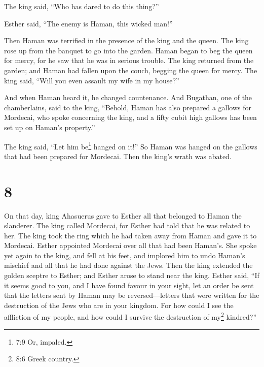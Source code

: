 The king said, ``Who has dared to do this thing?''

 Esther said, ``The enemy is Haman, this wicked man!''

Then Haman was terrified in the presence of the king and the queen.
 The king rose up from the banquet to go into the garden.
Haman began to beg the queen for mercy, for he saw that he was in
serious trouble.  The king returned from the garden; and
Haman had fallen upon the couch, begging the queen for mercy. The king
said, ``Will you even assault my wife in my house?''

And when Haman heard it, he changed countenance.  And
Bugathan, one of the chamberlains, said to the king, ``Behold, Haman has
also prepared a gallows for Mordecai, who spoke concerning the king, and
a fifty cubit high gallows has been set up on Haman's property.''

The king said, ``Let him be\footnote{7:9 Or, impaled.} hanged on it!''
 So Haman was hanged on the gallows that had been prepared
for Mordecai. Then the king's wrath was abated.

\hypertarget{section-7}{%
\section{8}\label{section-7}}

 On that day, king Ahasuerus gave to Esther all that
belonged to Haman the slanderer. The king called Mordecai, for Esther
had told that he was related to her.  The king took the ring
which he had taken away from Haman and gave it to Mordecai. Esther
appointed Mordecai over all that had been Haman's.  She
spoke yet again to the king, and fell at his feet, and implored him to
undo Haman's mischief and all that he had done against the Jews.
 Then the king extended the golden sceptre to Esther; and
Esther arose to stand near the king.  Esther said, ``If it
seems good to you, and I have found favour in your sight, let an order
be sent that the letters sent by Haman may be reversed---letters that
were written for the destruction of the Jews who are in your kingdom.
 For how could I see the affliction of my people, and how
could I survive the destruction of my\footnote{8:6 Greek country.}
kindred?''

